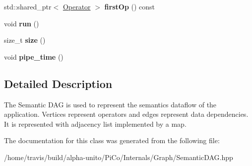 \begin{DoxyCompactItemize}
\item 
\hypertarget{class_semantic_d_a_g_ab96250cbbb40055b878c59e3bdd49961}{std\-::shared\-\_\-ptr$<$ \hyperlink{class_operator}{\-Operator} $>$ {\bfseries first\-Op} () const }\label{class_semantic_d_a_g_ab96250cbbb40055b878c59e3bdd49961}

\item 
\hypertarget{class_semantic_d_a_g_af4c527c88b2d24640e11fa16a8caf6a1}{void {\bfseries run} ()}\label{class_semantic_d_a_g_af4c527c88b2d24640e11fa16a8caf6a1}

\item 
\hypertarget{class_semantic_d_a_g_a08f38d352f8443b9df101dd3d319829e}{size\-\_\-t {\bfseries size} ()}\label{class_semantic_d_a_g_a08f38d352f8443b9df101dd3d319829e}

\item 
\hypertarget{class_semantic_d_a_g_a7baba525a4392f098163640eab4f29e4}{void {\bfseries pipe\-\_\-time} ()}\label{class_semantic_d_a_g_a7baba525a4392f098163640eab4f29e4}

\end{DoxyCompactItemize}


\subsection{\-Detailed \-Description}
\-The \-Semantic \-D\-A\-G is used to represent the semantics dataflow of the application. \-Vertices represent operators and edges represent data dependencies. \-It is represented with adjacency list implemented by a map. 

\-The documentation for this class was generated from the following file\-:\begin{DoxyCompactItemize}
\item 
/home/travis/build/alpha-\/unito/\-Pi\-Co/\-Internals/\-Graph/\-Semantic\-D\-A\-G.\-hpp\end{DoxyCompactItemize}
